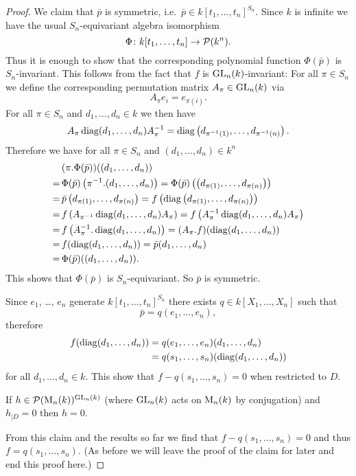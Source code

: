 \begin{proof}
 We claim that $\bar{p}$ is symmetric, i.e.\ $\bar{p} \in k[t_1, \dotsc, t_n]^{S_n}$. Since $k$ is infinite we have the usual $S_n$-equivariant algebra isomorphism
 \[
 \Phi \colon k[t_1, \dotsc, t_n] \to \mathcal{P}(k^n).
 \]
 Thus it is enough to show that the corresponding polynomial function $\Phi(\bar{p})$ is $S_n$-invariant. This follows from the fact that $f$ is $\operatorname{GL}_n(k)$-invariant: For all $\pi \in S_n$ we define the corresponding permutation matrix $A_\pi \in \operatorname{GL}_n(k)$ via
 \[
  A_\pi e_i = e_{\pi(i)}.
 \]
 For all $\pi \in S_n$ and $d_1, \dotsc, d_n \in k$ we then have
 \[
  A_\pi \operatorname{diag}(d_1, \dotsc, d_n) A_\pi^{-1}
  = \operatorname{diag}\left(d_{\pi^{-1}(1)}, \dotsc, d_{\pi^{-1}(n)}\right).
 \]
 Therefore we have for all $\pi \in S_n$ and $(d_1, \dotsc, d_n) \in k^n$
 \begin{align*}
  &\,(\pi.\Phi(\bar{p}))((d_1, \dotsc, d_n)) \\
  =&\, \Phi(\bar{p})\left(\pi^{-1}.(d_1, \dotsc, d_n)\right)
  = \Phi(\bar{p})\left(\left(d_{\pi(1)}, \dotsc, d_{\pi(n)}\right)\right) \\
  =&\, \bar{p}\left(d_{\pi(1)}, \dotsc, d_{\pi(n)}\right)
  = f\left(\operatorname{diag}\left(d_{\pi(1)}, \dotsc, d_{\pi(n)}\right)\right) \\
  =&\, f\left(A_{\pi^{-1}} \operatorname{diag}(d_1, \dotsc, d_n) A_\pi\right)
  = f\left(A_\pi^{-1} \operatorname{diag}(d_1, \dotsc, d_n) A_\pi\right) \\
  =&\, f\left(A_\pi^{-1}.\operatorname{diag}(d_1, \dotsc, d_n)\right)
  = (A_\pi.f)(\operatorname{diag}(d_1, \dotsc, d_n)) \\
  =&\, f(\operatorname{diag}(d_1, \dotsc, d_n))
  = \bar{p}(d_1, \dotsc, d_n) \\
  =&\, \Phi(\bar{p})((d_1, \dotsc, d_n)).
 \end{align*}
 This shows that $\Phi(\bar{p})$ is $S_n$-equivariant. So $\bar{p}$ is symmetric.
 
 Since $e_1$, \dots, $e_n$ generate $k[t_1, \dotsc, t_n]^{S_n}$ there exists $q \in k[X_1, \dotsc, X_n]$ such that
 \[
  \bar{p} = q(e_1, \dotsc, e_n),
 \]
 therefore
 \begin{align*}
  f(\operatorname{diag}(d_1, \dotsc, d_n))
  &= q(e_1, \dotsc, e_n)(d_1, \dotsc, d_n) \\
  &= q(s_1, \dotsc, s_n)(\operatorname{diag}(d_1, \dotsc, d_n))
 \end{align*}
 for all $d_1, \dotsc, d_n \in k$. This show that $f-q(s_1, \dotsc, s_n) = 0$ when restricted to $D$.
 
 \begin{claim}
  If $h \in \mathcal{P}(\operatorname{M}_n(k))^{\operatorname{GL}_n(k)}$ (where $\operatorname{GL}_n(k)$ acts on $\operatorname{M}_n(k)$ by conjugation) and $h_{|D} = 0$ then $h = 0$.
 \end{claim}

 From this claim and the results so far we find that $f - q(s_1, \dotsc, s_n) = 0$ and thus $f = q(s_1, \dotsc, s_n)$. (As before we will leave the proof of the claim for later and end this proof here.)
\end{proof}


